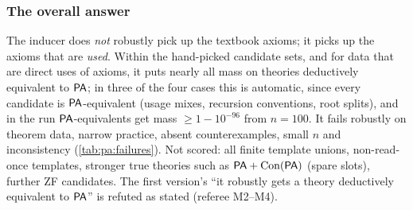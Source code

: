 \subsubsection{The overall answer}\label{sec:pa:answer}

The inducer does \emph{not} robustly pick up the textbook axioms; it picks up the axioms that are \emph{used}. Within the hand-picked candidate sets, and for data that are direct uses of axioms, it puts nearly all mass on theories deductively equivalent to $\mathsf{PA}$; in three of the four cases this is automatic, since every candidate is $\mathsf{PA}$-equivalent (usage mixes, recursion conventions, root splits), and in the \DTRC{} run $\mathsf{PA}$-equivalents get mass $\ge1-10^{-96}$ from $n=100$. It fails robustly on theorem data, narrow practice, absent counterexamples, small $n$ and inconsistency (\cref{tab:pa:failures}). Not scored: all finite template unions, non-read-once templates, stronger true theories such as $\mathsf{PA}+\mathrm{Con}(\mathsf{PA})$ (spare slots), further ZF candidates. The first version's ``it robustly gets a theory deductively equivalent to $\mathsf{PA}$'' is refuted as stated (referee M2--M4).
